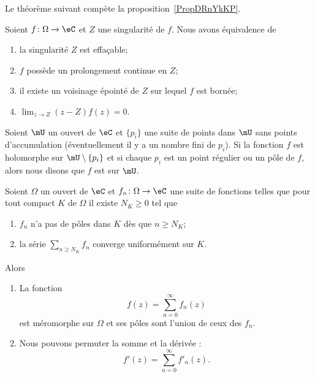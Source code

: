 Le théorème suivant compète la proposition~\ref{PropDRnYkKP}.
\begin{theorem}    \label{ThoTLQOEwW}
    Soient \( f\colon \Omega\to \eC\) et \( Z\) une singularité de \( f\). Nous avons équivalence de
    \begin{enumerate}
        \item
            la singularité \( Z\) est effaçable;
        \item
            \( f\) possède un prolongement continue en \( Z\);
        \item
            il existe un voisinage épointé de \( Z\) sur lequel \( f\) est bornée;
        \item
            \( \lim_{z\to Z}(z-Z)f(z)=0\).
    \end{enumerate}
\end{theorem}

\begin{definition}
    Soient \( \mU\) un ouvert de \( \eC\) et \( \{ p_i \}\) une suite de points dans \( \mU\) sans points d'accumulation (éventuellement il y a un nombre fini de \( p_i\)). Si la fonction \( f\) est holomorphe sur \( \mU\setminus\{ p_i \}\) et si chaque \( p_i\) est un point régulier ou un pôle de \( f\), alors nous disons que \( f\) est  sur \( \mU\).
\end{definition}

\begin{proposition} \label{PropPUZTQKl}
    Soient \( \Omega\) un ouvert de \( \eC\) et \( f_n\colon \Omega\to \eC\) une suite de fonctions telles que pour tout compact \( K\) de \( \Omega\) il existe \( N_K\geq 0\) tel que
    \begin{enumerate}
        \item
            \( f_n\) n'a pas de pôles dans \( K\) dès que \( n\geq N_K\);
        \item
            la série \( \sum_{n\geq N_K}f_n\) converge uniformément sur \( K\).
    \end{enumerate}
    Alors
    \begin{enumerate}
        \item
            La fonction
            \begin{equation}
                f(z)=\sum_{n=0}^{\infty}f_n(z)
            \end{equation}
            est méromorphe sur \( \Omega\) et ses pôles sont l'union de ceux des \( f_n\).
        \item
            Nous pouvons permuter la somme et la dérivée :
            \begin{equation}
                f'(z)=\sum_{n=0}^{\infty}f'_n(z).
            \end{equation}
    \end{enumerate}
\end{proposition}

